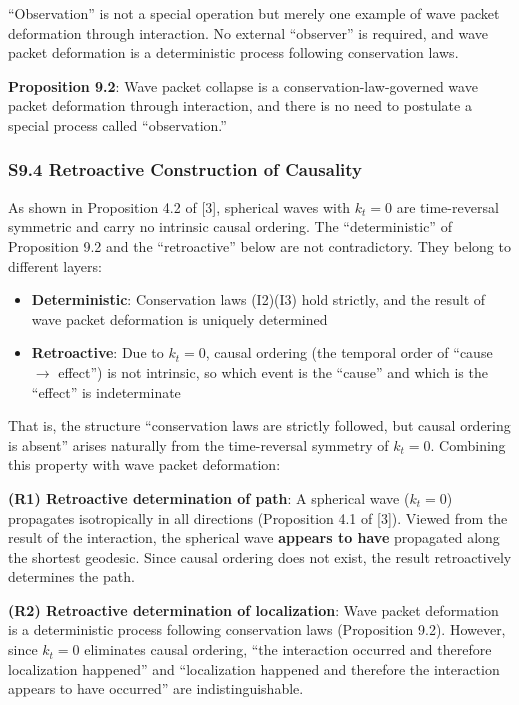 \documentclass[
  a4paper,11pt]{article}
\providecommand{\tightlist}{%
  \setlength{\itemsep}{0pt}\setlength{\parskip}{0pt}}
\theoremstyle{definition}
\theoremstyle{remark}
\begin{document}
``Observation'' is not a special operation but merely one example of
wave packet deformation through interaction. No external ``observer'' is
required, and wave packet deformation is a deterministic process
following conservation laws.

\textbf{Proposition 9.2}: Wave packet collapse is a
conservation-law-governed wave packet deformation through interaction,
and there is no need to postulate a special process called
``observation.''

\subsubsection{S9.4 Retroactive Construction of
Causality}\label{s9.4-retroactive-construction-of-causality}

As shown in Proposition 4.2 of {[}3{]}, spherical waves with \(k_t = 0\)
are time-reversal symmetric and carry no intrinsic causal ordering. The
``deterministic'' of Proposition 9.2 and the ``retroactive'' below are
not contradictory. They belong to different layers:

\begin{itemize}
\tightlist
\item
  \textbf{Deterministic}: Conservation laws (I2)(I3) hold strictly, and
  the result of wave packet deformation is uniquely determined
\item
  \textbf{Retroactive}: Due to \(k_t = 0\), causal ordering (the
  temporal order of ``cause \(\to\) effect'') is not intrinsic, so which
  event is the ``cause'' and which is the ``effect'' is indeterminate
\end{itemize}

That is, the structure ``conservation laws are strictly followed, but
causal ordering is absent'' arises naturally from the time-reversal
symmetry of \(k_t = 0\). Combining this property with wave packet
deformation:

\textbf{(R1) Retroactive determination of path}: A spherical wave
(\(k_t = 0\)) propagates isotropically in all directions (Proposition
4.1 of {[}3{]}). Viewed from the result of the interaction, the
spherical wave \textbf{appears to have} propagated along the shortest
geodesic. Since causal ordering does not exist, the result retroactively
determines the path.

\textbf{(R2) Retroactive determination of localization}: Wave packet
deformation is a deterministic process following conservation laws
(Proposition 9.2). However, since \(k_t = 0\) eliminates causal
ordering, ``the interaction occurred and therefore localization
happened'' and ``localization happened and therefore the interaction
appears to have occurred'' are indistinguishable.
\end{document}
